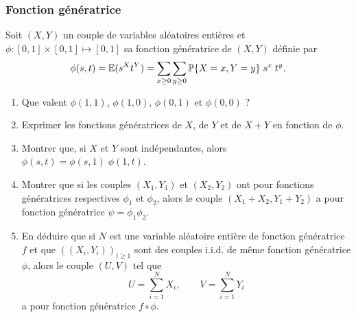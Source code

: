 \subsubsection{Fonction génératrice \todo{}}

Soit $(X, Y)$ un couple de variables aléatoires entières et $\phi: [0, 1] \times [0, 1] \mapsto [0, 1]$ sa fonction génératrice de $(X, Y)$ définie par 
$$
\phi(s, t) = \operatorname{\mathbb{E}}(s^X t^Y) = \sum_{x \geq 0} \sum_{y \geq 0} \operatorname{\mathbb{P}}\{X=x, Y=y\} \; s^x \; t^y.
$$
\begin{enumerate}
  \item Que valent $\phi(1, 1)$, $\phi(1, 0)$, $\phi(0, 1)$ et $\phi(0, 0)$ ?
  \solution{\todo{}}   
  \item Exprimer les fonctions génératrices de $X$, de $Y$ et de $X+Y$ en fonction de $\phi$.
  \solution{\todo{}}   
  \item Montrer que, si $X$ et $Y$ sont indépendantes, alors $\phi(s, t) = \phi(s, 1) \; \phi(1, t)$.
  \item Montrer que si les couples $(X_1, Y_1)$ et $(X_2, Y_2)$ ont pour fonctions génératrices respectives $\phi_1$ et $\phi_2$, alors le couple $(X_1+X_2, Y_1+Y_2)$ a pour fonction génératrice $\psi = \phi_1 \phi_2$. 
  \solution{\todo{}}   
  \item En déduire que si $N$ est une variable aléatoire entière de fonction génératrice $f$ et que $((X_i, Y_i))_{i \geq 1}$ sont des couples i.i.d. de même fonction génératrice $\phi$, alors le couple $(U, V)$ tel que
  $$
  U = \sum_{i=1}^N X_i, \qquad V = \sum_{i=1}^N Y_i
  $$
  a pour fonction génératrice $f \circ \phi$.
  \solution{\todo{}}   
\end{enumerate}

